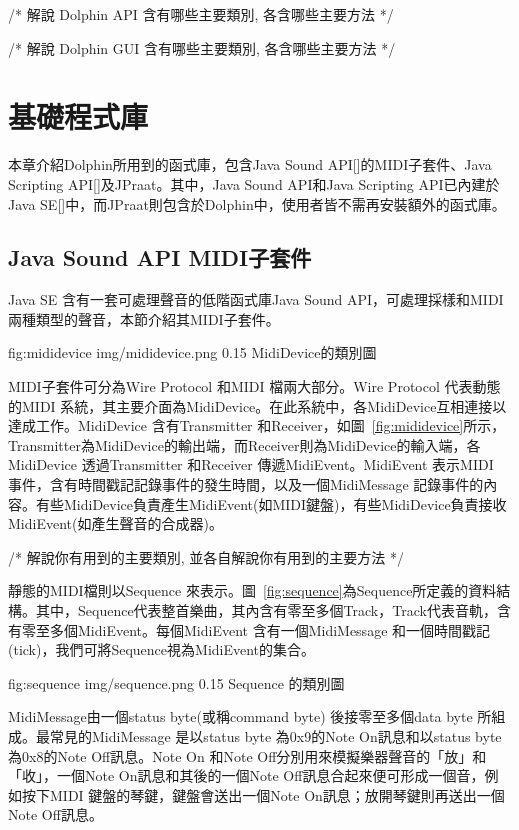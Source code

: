 \documentclass[12pt,a4paper,oneside]{report}
\begin{document}
/* 
解說 Dolphin API 含有哪些主要類別, 各含哪些主要方法
*/

/* 
解說 Dolphin GUI 含有哪些主要類別, 各含哪些主要方法
*/

\section{基礎程式庫} %

本章介紹Dolphin所用到的函式庫，包含Java Sound API[]的MIDI子套件、Java Scripting API[]及JPraat。其中，Java Sound API和Java Scripting API已內建於Java SE[]中，而JPraat則包含於Dolphin中，使用者皆不需再安裝額外的函式庫。

\subsection{Java Sound API MIDI子套件}

Java SE 含有一套可處理聲音的低階函式庫Java Sound API，可處理採樣和MIDI兩種類型的聲音，本節介紹其MIDI子套件。

\figurewithcaption
{fig:mididevice}
{img/mididevice.png}
{0.15}
{MidiDevice的類別圖}

MIDI子套件可分為Wire Protocol 和MIDI 檔兩大部分。Wire Protocol 代表動態的MIDI 系統，其主要介面為MidiDevice。在此系統中，各MidiDevice互相連接以達成工作。MidiDevice 含有Transmitter 和Receiver，如圖~\ref{fig:mididevice}所示，Transmitter為MidiDevice的輸出端，而Receiver則為MidiDevice的輸入端，各MidiDevice 透過Transmitter 和Receiver 傳遞MidiEvent。MidiEvent 表示MIDI 事件，含有時間戳記記錄事件的發生時間，以及一個MidiMessage 記錄事件的內容。有些MidiDevice負責產生MidiEvent(如MIDI鍵盤)，有些MidiDevice負責接收MidiEvent(如產生聲音的合成器)。

/*
     解說你有用到的主要類別, 並各自解說你有用到的主要方法
*/




靜態的MIDI檔則以Sequence 來表示。圖~\ref{fig:sequence}為Sequence所定義的資料結構。其中，Sequence代表整首樂曲，其內含有零至多個Track，Track代表音軌，含有零至多個MidiEvent。每個MidiEvent 含有一個MidiMessage 和一個時間戳記(tick)，我們可將Sequence視為MidiEvent的集合。

\figurewithcaption
{fig:sequence}
{img/sequence.png}
{0.15}
{Sequence 的類別圖}

MidiMessage由一個status byte(或稱command byte) 後接零至多個data byte 所組成。最常見的MidiMessage 是以status byte 為0x9的Note On訊息和以status byte 為0x8的Note Off訊息。Note On 和Note Off分別用來模擬樂器聲音的「放」和「收」，一個Note On訊息和其後的一個Note Off訊息合起來便可形成一個音，例如按下MIDI 鍵盤的琴鍵，鍵盤會送出一個Note On訊息；放開琴鍵則再送出一個Note Off訊息。
\end{document}
